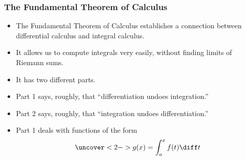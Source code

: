 \begin{frame}
\frametitle{The Fundamental Theorem of Calculus}
\begin{itemize}
\item  The Fundamental Theorem of Calculus establishes a connection between differential calculus and integral calculus.
\item  It allows us to compute integrals very easily, without finding limits of Riemann sums.
\item  It has two different parts.
\item  Part 1 says, roughly, that ``differentiation undoes integration.''
\item  Part 2 says, roughly, that ``integration undoes differentiation.''
\item<2->  Part 1 deals with functions of the form
\[
\uncover<2->{%
g(x) = \int_a^x  f(t) \diff t%
}%
\]
\end{itemize}
\end{frame}

